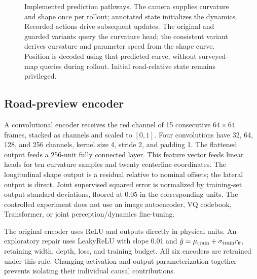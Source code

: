 \documentclass[preprint,12pt]{elsarticle}
\begin{document}
\begin{figure}[t]
\caption{Implemented prediction pathways. The camera supplies curvature and shape once per rollout; annotated state initializes the dynamics. Recorded actions drive subsequent updates. The original and guarded variants query the curvature head; the consistent variant derives curvature and parameter speed from the shape curve. Position is decoded using that predicted curve, without surveyed-map queries during rollout. Initial road-relative state remains privileged.}
\label{fig:arch}
\end{figure}
\subsection{Road-preview encoder}\label{sec:repr_learning}\label{sec:encoding}
A convolutional encoder receives the red channel of 15 consecutive $64\times64$
frames, stacked as channels and scaled to $[0,1]$. Four convolutions have
32, 64, 128, and 256 channels, kernel size 4, stride 2, and padding 1. The
flattened output feeds a 256-unit fully connected layer. This feature
vector feeds linear heads for ten curvature samples and twenty centerline
coordinates. The longitudinal shape output is a residual relative to nominal
offsets; the lateral output is direct. Joint supervised squared error is
normalized by training-set output standard deviations, floored at 0.05 in the
corresponding units. The controlled experiment does not use an image autoencoder,
VQ codebook, Transformer, or joint perception/dynamics fine-tuning.

The original encoder uses ReLU and outputs directly in physical units.
An exploratory repair uses LeakyReLU with slope 0.01 and
$\hat y=\mu_{\rm train}+\sigma_{\rm train}r_\theta$, retaining width, depth,
loss, and training budget. All six encoders are retrained under this rule.
Changing activation and output parameterization together prevents isolating
their individual causal contributions.
\end{document}
